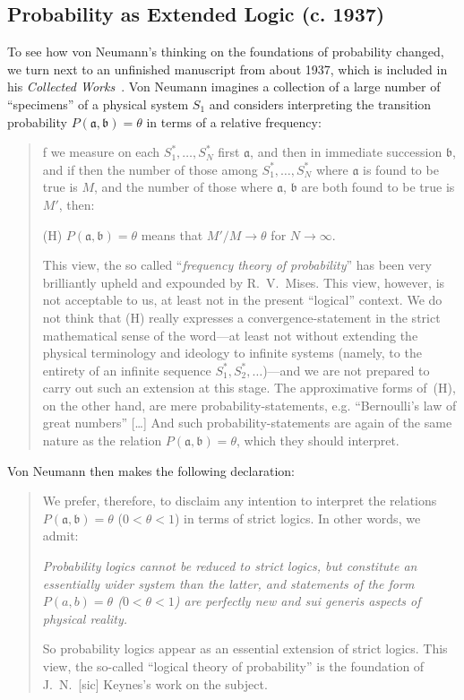 \documentclass[aps,pra,superscriptaddress,12pt,tightenlines,nofootinbib]{revtex4}
\newcommand{\booktitle}{\textsl}
\begin{document}
\subsection{Probability as Extended Logic (c. 1937)}

To see how von Neumann's thinking on the foundations of probability
changed, we turn next to an unfinished manuscript from about 1937,
which is included in his \booktitle{Collected Works}~\cite{VN-CW}.  Von
Neumann imagines a collection of a large number of ``specimens'' of a
physical system $S_1$ and considers interpreting the transition
probability $P(\mathfrak{a},\mathfrak{b}) = \theta$ in terms of a
relative frequency:
\begin{quotation}
\noindent [I]f we measure on each $S_1^*,\ldots,S_N^*$ first
$\mathfrak{a}$, and then in immediate succession $\mathfrak{b}$, and
if then the number of those among $S_1^*,\ldots,S_N^*$ where
$\mathfrak{a}$ is found to be true is $M$, and the number of those
where $\mathfrak{a}$, $\mathfrak{b}$ are both found to be true is
$M'$, then:

(H) $P(\mathfrak{a}, \mathfrak{b}) = \theta$ means that $M'/M \to
\theta$ for $N \to \infty$.

This view, the so called ``\emph{frequency theory of probability}''
has been very brilliantly upheld and expounded by R.\ V.\ Mises.  This
view, however, is not acceptable to us, at least not in the present
``logical'' context.  We do not think that (H) really expresses a
convergence-statement in the strict mathematical sense of the
word---at least not without extending the physical terminology and
ideology to infinite systems (namely, to the entirety of an infinite
sequence $S_1^*, S_2^*, \ldots$)---and we are not prepared to carry
out such an extension at this stage.  The approximative forms of~(H),
on the other hand, are mere probability-statements, e.g. ``Bernoulli's
law of great numbers'' [\ldots\!] And such probability-statements are
again of the same nature as the relation $P(\mathfrak{a},\mathfrak{b})
= \theta$, which they should interpret.
\end{quotation} 
Von Neumann then makes the following declaration:
\begin{quotation}
We prefer, therefore, to disclaim any intention to interpret the
relations $P(\mathfrak{a},\mathfrak{b}) = \theta$ ($0 < \theta < 1$)
in terms of strict logics.  In other words, we admit:

\emph{Probability logics cannot be reduced to strict logics, but
  constitute an essentially wider system than the latter, and
  statements of the form $P(a,b) = \theta$ ($0 < \theta < 1$) are
  perfectly new and \emph{sui generis} aspects of physical reality.}

So probability logics appear as an essential extension of strict
logics.  This view, the so-called ``logical theory of probability'' is
the foundation of J.\ N.\ [sic] Keynes's work on the subject.
\end{quotation}
\end{document}
